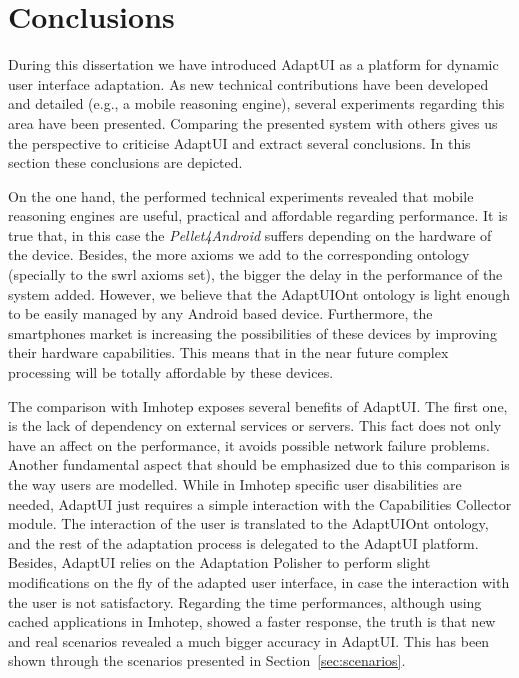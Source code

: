 \section{Conclusions}
\label{sec:evaluation_conclusions}

During this dissertation we have introduced AdaptUI as a platform for dynamic
user interface adaptation. As new technical contributions have been developed 
and detailed (e.g., a mobile reasoning engine), several experiments regarding 
this area have been presented. Comparing the presented system with others gives
us the perspective to criticise AdaptUI and extract several conclusions. In this
section these conclusions are depicted.

On the one hand, the performed technical experiments revealed that mobile 
reasoning engines are useful, practical and affordable regarding performance. It
is true that, in this case the \textit{Pellet4Android} suffers depending on the 
hardware of the device. Besides, the more axioms we add to the corresponding 
ontology (specially to the \ac{swrl} axioms set), the bigger the delay in the 
performance of the system added. However, we believe that the AdaptUIOnt ontology 
is light enough to be easily managed by any Android based device. Furthermore, 
the smartphones market is increasing the possibilities of these devices by 
improving their hardware capabilities. This means that in the near future 
complex processing will be totally affordable by these devices. 

The comparison with Imhotep exposes several benefits of AdaptUI. The first one, 
is the lack of dependency on external services or servers. This fact does not 
only have an affect on the performance, it avoids possible network failure 
problems. Another fundamental aspect that should be emphasized due to this 
comparison is the way users are modelled. While in Imhotep specific user 
disabilities are needed, AdaptUI just requires a simple interaction with the 
Capabilities Collector module. The interaction of the user is translated to the 
AdaptUIOnt ontology, and the rest of the adaptation process is delegated to the 
AdaptUI platform. Besides, AdaptUI relies on the Adaptation Polisher to perform
slight modifications on the fly of the adapted user interface, in case the 
interaction with the user is not satisfactory. Regarding the time performances, 
although using cached applications in Imhotep, showed a faster response, the 
truth is that new and real scenarios revealed a much bigger accuracy in AdaptUI. 
This has been shown through the scenarios presented in Section~\ref{sec:scenarios}.

